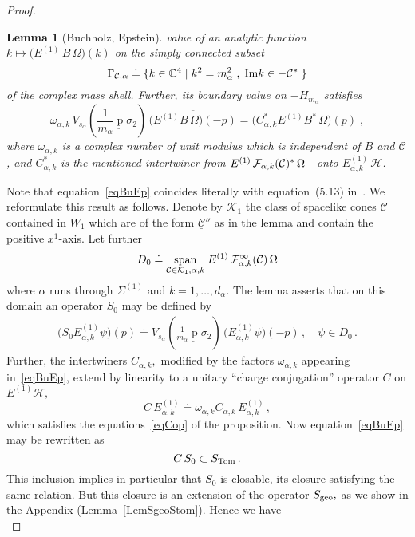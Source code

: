 \documentclass[a4paper,reqno,11pt]{amsart}
\theoremstyle{plain}
\newtheorem{Lem}[Thm]{Lemma}
\theoremstyle{definition}
\numberwithin{equation}{section}
\newcommand{\Bc}{\mathbb{C}}
\newcommand{\F}{{\mathcal F}}
\newcommand{\calH}{{\mathcal H}}
\newcommand{\calC}{{\mathcal C}}
\newcommand{\calK}{{\mathcal K}}
\newcommand{\utilde}[1]{\mathop{#1}\limits_{\widetilde{\phantom{\textstyle
 #1}}}}
\newcommand{\clo}{ {\mbox{\bf --}} }
\newcommand{\im}{{\rm Im }}
\newcommand{\Sec}{\Sigma} %
\renewcommand{\sec}{\alpha}
\newcommand{\Sece}{\Sec^{(1)}} %
\newcommand{\Stome}{S_{\rm Tom}} %
\newcommand{\Sgeoe}{S_{\rm geo}}  %
\newcommand{\msec}{{m_{\sec}}}
\newcommand{\ssec}{{s_{\sec}}}
\newcommand{\Ee}{E^{(1)}}
\newcommand{\Eeseck}{\Ee_{\sec,k}}
\newcommand{\Cop}{C}        %
\newcommand{\cone}{\calC}   %
\begin{document}
\begin{proof}
\begin{Lem}[Buchholz, Epstein]
value of an analytic function $k\mapsto \big(\Ee\,B\,\Omega\big)(k)$ 
on the simply connected subset 
\[ 
\Gamma_{\cone,\sec}\doteq\{ k\in\Bc^4\;|\; k^2=m_\sec^2\;,\; 
\im k\in-\cone^*\; \} 
\]
of the complex mass shell. Further,  its boundary value on $-H_\msec$
satisfies  
\begin{equation} \label{eqBuEp}
\omega_{\sec,k}\,V_{\ssec}(\frac{1}{\msec}\utilde{p} \sigma_2)\,
 \overline{\big(\Ee B\,\Omega\big)(-p)}
=\big(\Cop_{\sec,k}^*\Ee B^*\,\Omega\big)(p)\;,
\end{equation}
where $\omega_{\sec,k}$ is a complex number of unit modulus which is 
independent of $B$ and $\underline{\cone}$, and $\Cop_{\sec,k}^*$ is
the mentioned intertwiner from $\Ee\,\F_{\sec,k}(\cone)^*\,\Omega^\clo$ onto  
$\Eeseck\,\calH$. 
\end{Lem} 
Note that equation~\eqref{eqBuEp} coincides literally with equation~(5.13)
in~\cite{BuEp}. 
We reformulate this result as follows. Denote by $\calK_1$ the
class of spacelike cones $\cone$ contained in $W_1$ which are of the form 
$\underline{\cone}''$ as in the lemma and contain the positive $x^1$-axis. 
Let further 
\begin{align} \label{eqD0}
D_0\doteq
\underset{\cone\in\calK_1,\sec,k}{{\rm span}}\;
\Ee\,\F_{\sec,k}^\infty(\cone)\,\Omega 
\end{align}
where $\sec$ runs through $\Sece$ and $k=1,\ldots,d_\sec.$ 
The lemma asserts that on this domain an operator $S_0$ may be 
defined by 
\begin{align}   \label{eqS0}
 \big(S_0\Eeseck\psi\big)(p)\doteq 
V_{\ssec}(\frac{1}{\msec}\utilde{p}\sigma_2)\,
\overline{\big(\Eeseck\psi\big)(-p)}\,,\quad\psi\in D_0\,. 
\end{align}
Further, the intertwiners $\Cop_{\sec,k},$ modified by the factors 
$\omega_{\sec,k}$ appearing in~\eqref{eqBuEp}, extend by linearity to a 
unitary ``charge conjugation'' operator $\Cop$ on $\Ee\calH,$ 
\[ \Cop \,\Eeseck \doteq \omega_{\sec,k}\Cop_{\sec,k}\,\Eeseck\,,
\]
which satisfies the equations~\eqref{eqCop} of the proposition. 
Now equation~\eqref{eqBuEp} may  be rewritten as 
\begin{equation} \label{eqBuEp'}
 \Cop\,S_0\subset \Stome\,. 
\end{equation}
This inclusion implies in 
particular that $S_0$ is closable, its closure satisfying the same  relation.
But this closure is an extension of the operator $\Sgeoe,$ as we show
in the Appendix (Lemma~\ref{LemSgeoStom}). Hence we have 
\begin{equation}  \label{eqSgeoStom}

\end{equation}
\end{proof}
\end{document}

